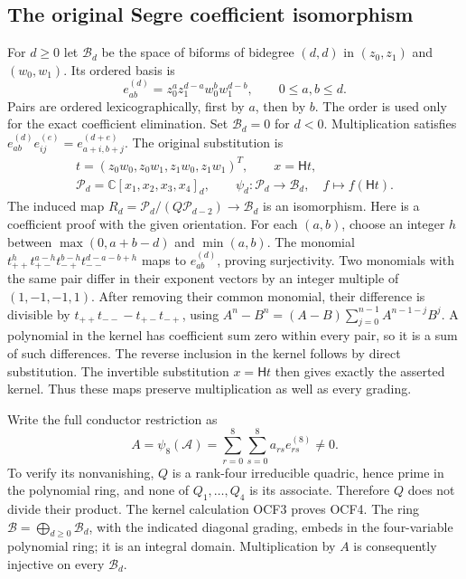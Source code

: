 \subsection{The original Segre coefficient isomorphism}

For $d\geq0$ let $\mathcal B_d$ be the space of biforms of
bidegree $(d,d)$ in $(z_0,z_1)$ and $(w_0,w_1)$. Its ordered basis is
\[
 e_{ab}^{(d)}=z_0^a z_1^{d-a}w_0^b w_1^{d-b},
 \qquad 0\leq a,b\leq d.
 \tag{OCF2}
\]
Pairs are ordered lexicographically, first by $a$, then by $b$.
The order is used only for the exact coefficient elimination.
Set $\mathcal B_d=0$ for $d<0$. Multiplication satisfies
$e_{ab}^{(d)}e_{ij}^{(e)}=e_{a+i,b+j}^{(d+e)}$.
The original substitution is
\[
 \begin{gathered}
 t=(z_0w_0,z_0w_1,z_1w_0,z_1w_1)^T,\qquad x=\mathsf Ht,\\
 \mathscr P_d=\mathbb C[x_1,x_2,x_3,x_4]_d,\qquad
 \psi_d:\mathscr P_d\longrightarrow\mathcal B_d,\quad
 f\longmapsto f(\mathsf Ht).
 \end{gathered}\tag{OCF3}
\]
The induced map
$R_d=\mathscr P_d/(Q\mathscr P_{d-2})\longrightarrow\mathcal B_d$
is an isomorphism. Here is a coefficient proof with the given
orientation. For each $(a,b)$, choose an integer
$h$ between $\max(0,a+b-d)$ and $\min(a,b)$. The monomial
$t_{++}^{h}t_{+-}^{a-h}t_{-+}^{b-h}t_{--}^{d-a-b+h}$ maps
to $e_{ab}^{(d)}$, proving surjectivity. Two monomials with
the same pair differ in their exponent vectors by an integer
multiple of $(1,-1,-1,1)$. After removing their common monomial,
their difference is divisible by $t_{++}t_{--}-t_{+-}t_{-+}$,
using $A^n-B^n=(A-B)\sum_{j=0}^{n-1}A^{n-1-j}B^j$.
A polynomial in the kernel has coefficient sum zero within every
pair, so it is a sum of such differences. The reverse inclusion
in the kernel follows by direct substitution. The invertible
substitution $x=\mathsf Ht$ then gives exactly the asserted kernel.
Thus these maps preserve multiplication as well as every grading.

Write the full conductor restriction as
\[
 A=\psi_8(\mathcal A)
     =\sum_{r=0}^8\sum_{s=0}^8 a_{rs}e_{rs}^{(8)}\ne0.
 \tag{OCF4}
\]
To verify its nonvanishing, $Q$ is a rank-four irreducible quadric,
hence prime in the polynomial ring, and none of $Q_1,\ldots,Q_4$
is its associate. Therefore $Q$ does not divide their product.
The kernel calculation OCF3 proves OCF4. The ring
$\mathcal B=\bigoplus_{d\geq0}\mathcal B_d$, with the indicated
diagonal grading, embeds in the four-variable polynomial ring;
it is an integral domain. Multiplication by $A$ is consequently
injective on every $\mathcal B_d$.

